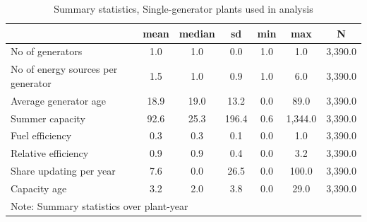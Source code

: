 \begin{table}[htbp]\centering
\scriptsize
\def\sym#1{\ifmmode^{#1}\else\(^{#1}\)\fi}
\caption{Summary statistics, Single-generator plants used in analysis}
\begin{tabular}{l*{1}{cccccc}}
\hline\hline
                    &        mean&      median&          sd&         min&         max&           N\\
\hline
No of generators    &         1.0&         1.0&         0.0&         1.0&         1.0&     3,390.0\\
No of energy sources per generator&         1.5&         1.0&         0.9&         1.0&         6.0&     3,390.0\\
Average generator age&        18.9&        19.0&        13.2&         0.0&        89.0&     3,390.0\\
Summer capacity     &        92.6&        25.3&       196.4&         0.6&     1,344.0&     3,390.0\\
Fuel efficiency     &         0.3&         0.3&         0.1&         0.0&         1.0&     3,390.0\\
Relative efficiency &         0.9&         0.9&         0.4&         0.0&         3.2&     3,390.0\\
Share updating per year&         7.6&         0.0&        26.5&         0.0&       100.0&     3,390.0\\
Capacity age        &         3.2&         2.0&         3.8&         0.0&        29.0&     3,390.0\\
\hline\hline
\multicolumn{7}{l}{\footnotesize Note: Summary statistics over plant-year}\\
\end{tabular}
\end{table}
